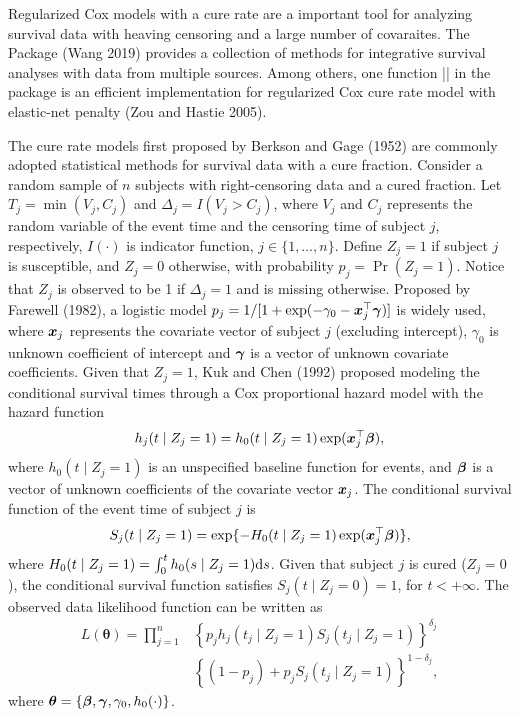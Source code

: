 Regularized Cox models with a cure rate are a important tool for
analyzing survival data with heaving censoring and a large number of
covaraites. The  Package  (Wang 2019) provides
a collection of methods for integrative survival analyses with data from
multiple sources. Among others, one function
\VERB|\NormalTok{()}| in the package is an
efficient implementation for regularized Cox cure rate model with
elastic-net penalty (Zou and Hastie 2005).

The cure rate models first proposed by Berkson and Gage (1952) are
commonly adopted statistical methods for survival data with a cure
fraction. Consider a random sample of \(n\) subjects with
right-censoring data and a cured fraction. Let \(T_j=\min(V_j, C_j)\)
and \(\Delta_j=I(V_j > C_j)\), where \(V_j\) and \(C_j\) represents the
random variable of the event time and the censoring time of subject
\(j\), respectively, \(I(\cdot)\) is indicator function,
\(j\in\{1,\ldots,n\}\). Define \(Z_j = 1\) if subject \(j\) is
susceptible, and \(Z_j = 0\) otherwise, with probability
\(p_j = \Pr(Z_j = 1)\). Notice that \(Z_j\) is observed to be 1 if
\(\Delta_j=1\) and is missing otherwise. Proposed by Farewell (1982), a
logistic model \(p_j=1/[1+\exp(-\gamma_0-\bm{x}^{\top}_j\bm{\gamma})]\) is widely
used, where \(\bm{x}_j\) represents the covariate vector of subject \(j\)
(excluding intercept), \(\gamma_0\) is unknown coefficient of intercept
and \(\bm{\gamma}\) is a vector of unknown covariate coefficients. Given that
\(Z_j = 1\), Kuk and Chen (1992) proposed modeling the conditional
survival times through a Cox proportional hazard model with the hazard
function
\[h_j(t\mid Z_j = 1) = h_0(t\mid Z_j = 1) \exp(\bm{x}_j^{\top}\bm{\beta}),\] where
\(h_0(t\mid Z_j = 1)\) is an unspecified baseline function for events,
and \(\bm{\beta}\) is a vector of unknown coefficients of the covariate vector
\(\bm{x}_j\). The conditional survival function of the event time of
subject \(j\) is
\[S_j(t\mid Z_j = 1) = \exp\{-H_0(t\mid Z_j = 1) \exp(\bm{x}_j^{\top} \bm{\beta}) \},\]
where \(H_0(t\mid Z_j = 1) = \int_0^t h_0(s\mid Z_j = 1) \mathrm{d} s\). Given
that subject \(j\) is cured (\(Z_j = 0\)), the conditional survival
function satisfies \(S_j(t\mid Z_j=0) = 1\), for \(t<+\infty\). The
observed data likelihood function can be written as
\begin{align}\label{eqn:mod}
L(\bm{\theta}) = \prod_{j=1}^n
& \left\{ p_j h_j(t_j\mid Z_j=1) S_j(t_j\mid Z_j=1) \right\}^{\delta_j}\nonumber\\
& \left\{(1 - p_j) + p_j S_j(t_j \mid Z_j = 1)\right\}^{1-\delta_j},
\end{align} where \(\bm{\theta}=\{\bm{\beta},\bm{\gamma},\gamma_0,h_0(\cdot)\}\).

